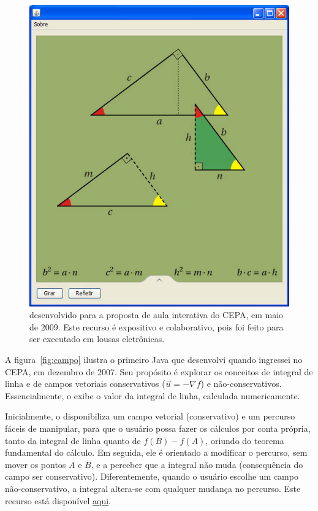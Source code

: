 \begin{figure}
\begin{minipage}[b]{0.46\textwidth}
			\includegraphics[width=\textwidth]{images/triangulo-retangulo.jpg}
			\caption{\footnotesize {} desenvolvido para a proposta de aula interativa do CEPA, em maio de 2009. Este recurso é expositivo e colaborativo, pois foi feito para ser executado em lousas eletrônicas.}
			\label{fig:rel-metr}
		\end{minipage}
	\end{figure}
	
	A figura~\ref{fig:campo} ilustra o primeiro  Java que desenvolvi quando ingressei no CEPA, em dezembro de 2007. Seu propósito é explorar os conceitos de integral de linha e de campos vetoriais conservativos ($\vec u = -\nabla f$) e não-conservativos. Essencialmente, o  exibe o valor da integral de linha, calculada numericamente.
	
	Inicialmente, o  disponibiliza um campo vetorial (conservativo) e um percurso fáceis de manipular, para que o usuário possa fazer os cálculos por conta própria, tanto da integral de linha quanto de $f(B) - f(A)$, oriundo do teorema fundamental do cálculo. Em seguida, ele é orientado a modificar o percurso, sem mover os pontos $A$ e $B$, e a perceber que a integral não muda (consequência do campo ser conservativo). Diferentemente, quando o usuário escolhe um campo não-conservativo, a integral altera-se com qualquer mudança no percurso. Este recurso está disponível \href{http://cepa.if.usp.br/old/files/simulation/javaapplet/PathIntegralAtContainer.html}{aqui}.
	
